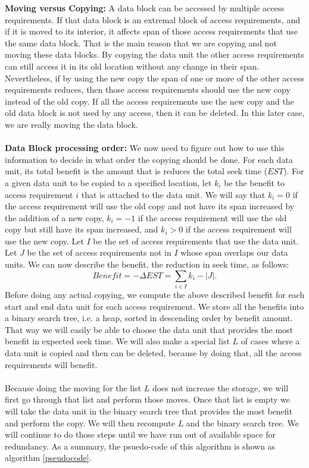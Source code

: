 {\bf Moving versus Copying:} A data block can be accessed by multiple access
requirements. If that data block is an extremal block of access
requirements, and if it is moved to its interior, it affects span of those access
requirements that use the
same data block. That is the main reason that we are copying and not moving
these data blocks. By copying the data unit the other access requirements can
still access it in its old location without any change in their span.
Nevertheless, if by using the new copy the span of one or more of the other
access requirements reduces, then those access requirements should use the new
copy instead of the old copy. If all the access requirements use the new copy
and the old data block is not used by any access, then it can be deleted. In
this later case, we are really moving the data block. \\
\\
{\bf Data Block processing order:} 
We now need to figure out how to use this
information to decide in what order the copying should be done. For each data
unit, its total benefit is the amount that is reduces the total seek time
($EST$). For a given data unit to be copied to a specified location, let $k_i$
be the benefit to access requirement $i$ that is attached to the data unit. We
will say that $k_i=0$ if the access requirement will use the old copy and not have its span increased by the addition of a new copy, $k_i=-1$ if the access requirement will use the old copy but still have its span increased, and
$k_i>0$ if the access requirement will use the new copy. Let $I$ be the set of
access requirements that use the data unit. Let $J$ be the set of access
requirements not in $I$ whose span overlaps our data units. We can now describe
the benefit, the reduction in seek time, as follows:
\[
Benefit = -\Delta EST = \sum_{i \in I} k_i - |J|.
\]
Before doing any actual copying, we compute the above described benefit for
each start and end data unit for each access requirement. We store all the
benefits into a binary search tree, i.e. a heap, sorted in descending order by benefit
amount. That way we will easily be able to choose the data unit that provides
the most benefit in expected seek time. We will also make a special list $L$ of
cases where a data unit is copied and then can be deleted, because by doing
that, all the access
requirements will benefit. \\
\\
Because doing the moving for the list $L$ does not increase the storage, we will first go through that list and perform those moves. Once that list is empty we will take the data unit in the binary search tree that provides the most benefit and perform the copy. We will then recompute $L$ and the binary search tree. We will continue to do those steps until we have run out of available space for redundancy. As a summary, the psuedo-code of this algorithm is shown as algorithm \ref{pseudocode}.

